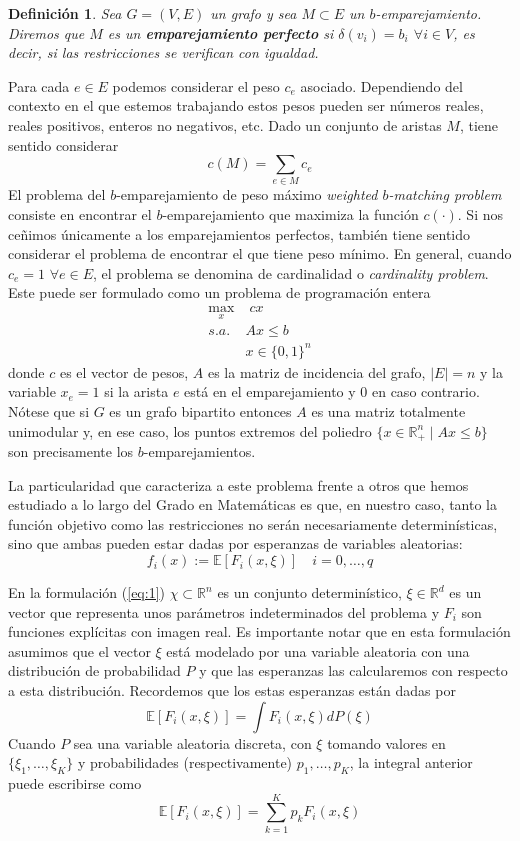 \documentclass[twoside,a4paper,openright,12pt]{book}
\newtheorem{defi}{Definici\'on}[section]
\newcommand{\R}{\mathbb{R}}
\newcommand{\E}{\mathbb{E}}
\begin{document}
\begin{defi}
Sea $G=(V,E)$ un grafo y sea $M\subset E$ un $b$-emparejamiento. Diremos que $M$ es un \textbf{emparejamiento perfecto} si $\delta(v_i)=b_i$ $\forall i \in V$, es decir, si las restricciones se verifican con igualdad.
\end{defi}
Para cada $e\in E$ podemos considerar el peso $c_e$ asociado. Dependiendo del contexto en el que estemos trabajando estos pesos pueden ser números reales, reales positivos, enteros no negativos, etc. Dado un conjunto de aristas $M$, tiene sentido considerar
$$
c(M)=\sum_{e\in M} c_e
$$
El problema del $b$-emparejamiento de peso máximo \textit{weighted $b$-matching problem} consiste en encontrar el $b$-emparejamiento que maximiza la función $c(\cdot)$. Si nos ceñimos únicamente a los emparejamientos perfectos, también tiene sentido considerar el problema de encontrar el que tiene peso mínimo. En general, cuando $c_e=1$ $\forall e\in E$, el problema se denomina de cardinalidad o \textit{cardinality problem}. Este puede ser formulado como un problema de programación entera
\begin{align}
\max_{x} &\; cx  \nonumber\\ 
s.a.\;  &  Ax\leq b \tag{1} \label{eq:1}\\
& x\in\{0,1\}^n\nonumber
\end{align}
donde $c$ es el vector de pesos, $A$ es la matriz de incidencia del grafo, $|E|=n$ y la variable $x_e=1$ si la arista $e$ está en el emparejamiento y $0$ en caso contrario. Nótese que si $G$ es un grafo bipartito entonces $A$ es una matriz totalmente unimodular y, en ese caso, los puntos extremos del poliedro $\{x \in \R^n_+\mid Ax\leq b\}$ son precisamente los $b$-emparejamientos.

\newpage


La particularidad que caracteriza a este problema frente a otros que hemos estudiado a lo largo del Grado en Matemáticas es que, en nuestro caso, tanto la función objetivo como las restricciones no serán necesariamente determinísticas, sino que ambas pueden estar dadas por esperanzas de variables aleatorias:
$$ 
f_i(x):=\E[F_i(x,\xi)] \quad i=0,\dotsc,q
$$

En la formulación (\ref{eq:1}) $\chi\subset \R^n$ es un conjunto determinístico, $\xi\in\R^d$ es un vector que representa unos parámetros indeterminados del problema y $F_i$ son funciones explícitas con imagen real. Es importante notar que en esta formulación asumimos que el vector $\xi$ está modelado por una variable aleatoria con una distribución de probabilidad $P$ y que las esperanzas las calcularemos con respecto a esta distribución. Recordemos que los estas esperanzas están dadas por
$$
\E[F_i(x,\xi)]=\int F_i(x,\xi)dP(\xi)
$$
Cuando $P$ sea una variable aleatoria discreta, con $\xi$ tomando valores en $\{\xi_1,\dotsc,\xi_K\}$ y probabilidades (respectivamente) $p_1,\dotsc,p_K$, la integral anterior puede escribirse como
$$
\E[F_i(x,\xi)] = \sum_{k=1}^K p_k F_i(x,\xi)
$$
\end{document}
